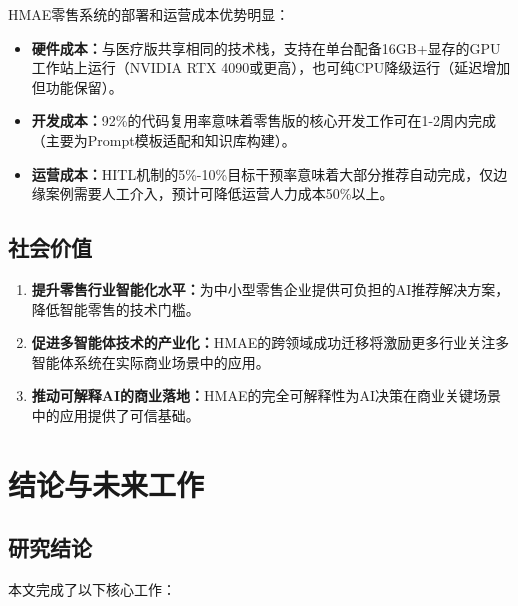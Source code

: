 \documentclass[11pt,a4paper]{ctexart}
\theoremstyle{remark}
\begin{document}
HMAE零售系统的部署和运营成本优势明显：
\begin{itemize}[nosep]
\item \textbf{硬件成本：}与医疗版共享相同的技术栈，支持在单台配备16GB+显存的GPU工作站上运行（NVIDIA RTX 4090或更高），也可纯CPU降级运行（延迟增加但功能保留）。
\item \textbf{开发成本：}92\%的代码复用率意味着零售版的核心开发工作可在1-2周内完成（主要为Prompt模板适配和知识库构建）。
\item \textbf{运营成本：}HITL机制的5\%-10\%目标干预率意味着大部分推荐自动完成，仅边缘案例需要人工介入，预计可降低运营人力成本50\%以上。
\end{itemize}

\subsection{社会价值}

\begin{enumerate}[nosep]
\item \textbf{提升零售行业智能化水平：}为中小型零售企业提供可负担的AI推荐解决方案，降低智能零售的技术门槛。
\item \textbf{促进多智能体技术的产业化：}HMAE的跨领域成功迁移将激励更多行业关注多智能体系统在实际商业场景中的应用。
\item \textbf{推动可解释AI的商业落地：}HMAE的完全可解释性为AI决策在商业关键场景中的应用提供了可信基础。
\end{enumerate}

\newpage

\section{结论与未来工作}

\subsection{研究结论}

本文完成了以下核心工作：
\end{document}
